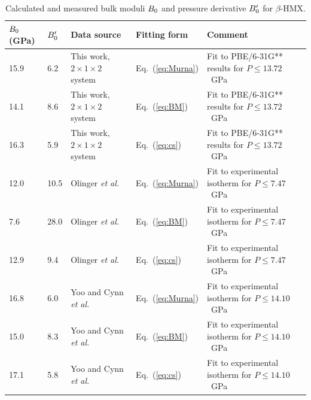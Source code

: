 \commentoutA{\documentclass[prl,aps,twocolumn,twocolumngrid,superbib]{revtex4}}
\begin{document}
\begin{table}[p]
\caption{Calculated and measured bulk moduli $B_0$ and pressure
derivative ${B'_0}$ for $\beta$-HMX.}
\begin{center}
\begin{tabular}{lllll}
\hline\hline
$B_0$(GPa) &   ${B'_0}$   &   Data source
&    Fitting form &      Comment \\
\hline
15.9 & 6.2 & This work, $2\times 1 \times 2$ system &  Eq.~(\ref{eq:Murna}) & Fit to PBE/6-31G** results for $P \le 13.72$~GPa \\
14.1 & 8.6 & This work, $2\times 1 \times 2$ system & Eq.~(\ref{eq:BM}) & Fit to PBE/6-31G** results for $P \le 13.72$~GPa \\
16.3 & 5.9 & This work, $2\times 1 \times 2$ system & Eq.~(\ref{eq:cs}) & Fit to PBE/6-31G** results for $P \le 13.72$~GPa \\
12.0 & 10.5 & Olinger {\it et al.}~\cite{BOlinger78} & Eq.~(\ref{eq:Murna}) & Fit to experimental isotherm for $P \le 7.47$~GPa\\
7.6& 28.0 & Olinger {\it et al.}~\cite{BOlinger78} & Eq.~(\ref{eq:BM}) & Fit to experimental isotherm for $P \le 7.47$~GPa\\
12.9 & 9.4 & Olinger {\it et al.}~\cite{BOlinger78} & Eq.~(\ref{eq:cs}) & Fit to experimental isotherm for $P \le 7.47$~GPa\\
16.8 & 6.0 & Yoo and Cynn {\it et al.}~\cite{Yoo_1999v111} & Eq.~(\ref{eq:Murna}) & Fit to experimental isotherm for $P \le 14.10$~GPa\\
15.0& 8.3 & Yoo and Cynn {\it et al.}~\cite{Yoo_1999v111} & Eq.~(\ref{eq:BM}) & Fit to experimental isotherm for $P \le 14.10$~GPa \\
17.1 & 5.8 & Yoo and Cynn {\it et al.}~\cite{Yoo_1999v111} & Eq.~(\ref{eq:cs}) & Fit to experimental isotherm for $P \le 14.10$~GPa \\
\hline\hline
\end{tabular}
\end{center}
\label{tab:Bulk}
\end{table}
\end{document}
